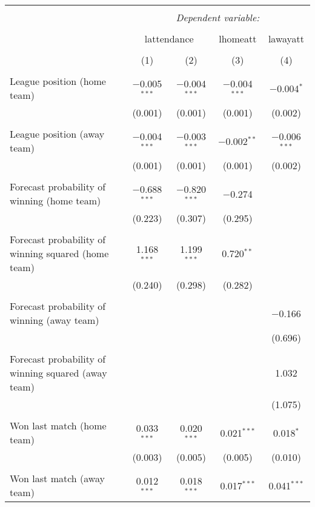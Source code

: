 
\begin{tabular}{@{\extracolsep{5pt}}lcccc} 
\\[-1.8ex]\hline 
\hline \\[-1.8ex] 
 & \multicolumn{4}{c}{\textit{Dependent variable:}} \\ 
\cline{2-5} 
\\[-1.8ex] & \multicolumn{2}{c}{lattendance} & lhomeatt & lawayatt \\ 
\\[-1.8ex] & (1) & (2) & (3) & (4)\\ 
\hline \\[-1.8ex] 
 League position (home team) & $-$0.005$^{***}$ & $-$0.004$^{***}$ & $-$0.004$^{***}$ & $-$0.004$^{*}$ \\ 
  & (0.001) & (0.001) & (0.001) & (0.002) \\ 
  & & & & \\ 
 League position (away team) & $-$0.004$^{***}$ & $-$0.003$^{***}$ & $-$0.002$^{**}$ & $-$0.006$^{***}$ \\ 
  & (0.001) & (0.001) & (0.001) & (0.002) \\ 
  & & & & \\ 
 Forecast probability of winning (home team) & $-$0.688$^{***}$ & $-$0.820$^{***}$ & $-$0.274 &  \\ 
  & (0.223) & (0.307) & (0.295) &  \\ 
  & & & & \\ 
 Forecast probability of winning squared (home team) & 1.168$^{***}$ & 1.199$^{***}$ & 0.720$^{**}$ &  \\ 
  & (0.240) & (0.298) & (0.282) &  \\ 
  & & & & \\ 
 Forecast probability of winning (away team) &  &  &  & $-$0.166 \\ 
  &  &  &  & (0.696) \\ 
  & & & & \\ 
 Forecast probability of winning squared (away team) &  &  &  & 1.032 \\ 
  &  &  &  & (1.075) \\ 
  & & & & \\ 
 Won last match (home team) & 0.033$^{***}$ & 0.020$^{***}$ & 0.021$^{***}$ & 0.018$^{*}$ \\ 
  & (0.003) & (0.005) & (0.005) & (0.010) \\ 
  & & & & \\ 
 Won last match (away team) & 0.012$^{***}$ & 0.018$^{***}$ & 0.017$^{***}$ & 0.041$^{***}$ \\ 

\end{tabular}
